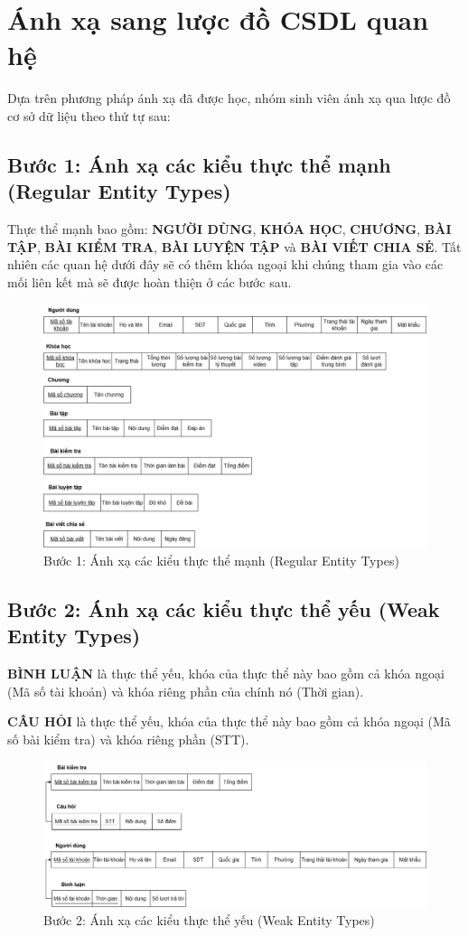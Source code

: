\section{Ánh xạ sang lược đồ CSDL quan hệ}
Dựa trên phương pháp ánh xạ đã được học, nhóm sinh viên ánh xạ qua lược đồ cơ sở dữ liệu theo thứ tự sau:

\subsection{Bước 1: Ánh xạ các kiểu thực thể mạnh (Regular Entity Types)}
Thực thể mạnh bao gồm: \textbf{NGƯỜI DÙNG}, \textbf{KHÓA HỌC}, \textbf{CHƯƠNG}, \textbf{BÀI TẬP}, \textbf{BÀI KIỂM TRA}, \textbf{BÀI LUYỆN TẬP} và \textbf{BÀI VIẾT CHIA SẺ}. Tất nhiên các quan hệ dưới đây sẽ có thêm khóa ngoại khi chúng tham gia vào các mối liên kết mà sẽ được hoàn thiện ở các bước sau.
\begin{figure}[H]
    \centering
    \includegraphics[width=1\linewidth]{picture/TTmanh.png}
    \caption{Bước 1: Ánh xạ các kiểu thực thể mạnh (Regular Entity Types)}
    \label{fig:placeholder}
\end{figure}
\subsection{Bước 2: Ánh xạ các kiểu thực thể yếu (Weak Entity Types)}
\textbf{BÌNH LUẬN} là thực thể yếu, khóa của thực thể này bao gồm cả khóa ngoại (Mã số tài khoản) và khóa riêng phần của chính nó (Thời gian).

\textbf{CÂU HỎI} là thực thể yếu, khóa của thực thể này bao gồm cả khóa ngoại (Mã số bài kiểm tra) và khóa riêng phần (STT).
\begin{figure}[H]
    \centering
    \includegraphics[width=1\linewidth]{picture/TTyeu.png}
    \caption{Bước 2: Ánh xạ các kiểu thực thể yếu (Weak Entity Types)}
    \label{fig:placeholder}
\end{figure}
\vspace{-20pt}
